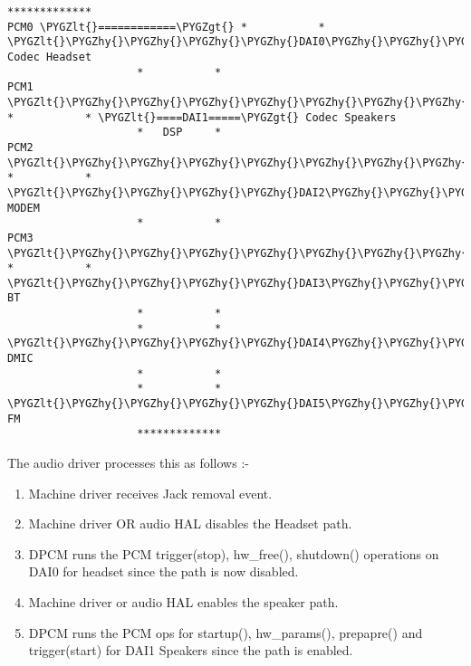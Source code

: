 \documentclass[a4paper,8pt,english]{sphinxmanual}
\def\PYGZlt{\char`\<}
\def\PYGZgt{\char`\>}
\def\PYGZhy{\char`\-}
\begin{document}
\begin{Verbatim}[commandchars=\\\{\}]
                    *************
PCM0 \PYGZlt{}============\PYGZgt{} *           * \PYGZlt{}\PYGZhy{}\PYGZhy{}\PYGZhy{}\PYGZhy{}DAI0\PYGZhy{}\PYGZhy{}\PYGZhy{}\PYGZhy{}\PYGZhy{}\PYGZgt{} Codec Headset
                    *           *
PCM1 \PYGZlt{}\PYGZhy{}\PYGZhy{}\PYGZhy{}\PYGZhy{}\PYGZhy{}\PYGZhy{}\PYGZhy{}\PYGZhy{}\PYGZhy{}\PYGZhy{}\PYGZhy{}\PYGZhy{}\PYGZgt{} *           * \PYGZlt{}====DAI1=====\PYGZgt{} Codec Speakers
                    *   DSP     *
PCM2 \PYGZlt{}\PYGZhy{}\PYGZhy{}\PYGZhy{}\PYGZhy{}\PYGZhy{}\PYGZhy{}\PYGZhy{}\PYGZhy{}\PYGZhy{}\PYGZhy{}\PYGZhy{}\PYGZhy{}\PYGZgt{} *           * \PYGZlt{}\PYGZhy{}\PYGZhy{}\PYGZhy{}\PYGZhy{}DAI2\PYGZhy{}\PYGZhy{}\PYGZhy{}\PYGZhy{}\PYGZhy{}\PYGZgt{} MODEM
                    *           *
PCM3 \PYGZlt{}\PYGZhy{}\PYGZhy{}\PYGZhy{}\PYGZhy{}\PYGZhy{}\PYGZhy{}\PYGZhy{}\PYGZhy{}\PYGZhy{}\PYGZhy{}\PYGZhy{}\PYGZhy{}\PYGZgt{} *           * \PYGZlt{}\PYGZhy{}\PYGZhy{}\PYGZhy{}\PYGZhy{}DAI3\PYGZhy{}\PYGZhy{}\PYGZhy{}\PYGZhy{}\PYGZhy{}\PYGZgt{} BT
                    *           *
                    *           * \PYGZlt{}\PYGZhy{}\PYGZhy{}\PYGZhy{}\PYGZhy{}DAI4\PYGZhy{}\PYGZhy{}\PYGZhy{}\PYGZhy{}\PYGZhy{}\PYGZgt{} DMIC
                    *           *
                    *           * \PYGZlt{}\PYGZhy{}\PYGZhy{}\PYGZhy{}\PYGZhy{}DAI5\PYGZhy{}\PYGZhy{}\PYGZhy{}\PYGZhy{}\PYGZhy{}\PYGZgt{} FM
                    *************
\end{Verbatim}

The audio driver processes this as follows :-
\begin{enumerate}
\item {} 
Machine driver receives Jack removal event.

\item {} 
Machine driver OR audio HAL disables the Headset path.

\item {} 
DPCM runs the PCM trigger(stop), hw\_free(), shutdown() operations on DAI0
for headset since the path is now disabled.

\item {} 
Machine driver or audio HAL enables the speaker path.

\item {} 
DPCM runs the PCM ops for startup(), hw\_params(), prepapre() and
trigger(start) for DAI1 Speakers since the path is enabled.

\end{enumerate}
\end{document}
